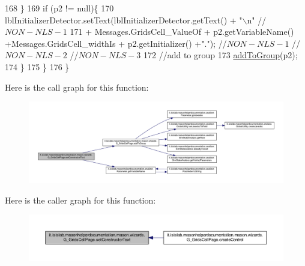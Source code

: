 \begin{DoxyCode}
168             \}
169             \textcolor{keywordflow}{if} (p2 != null)\{    
170                 lblInitializerDetector.setText(lblInitializerDetector.getText() + \textcolor{stringliteral}{"\(\backslash\)n"} \textcolor{comment}{//$NON-NLS-1$}
171                     +  Messages.GridsCell\_ValueOf + p2.getVariableName() +Messages.GridsCell\_widthIs + 
      p2.getInitializer() +\textcolor{stringliteral}{"."}); \textcolor{comment}{//$NON-NLS-1$ //$NON-NLS-2$ //$NON-NLS-3$}
172                 \textcolor{comment}{//add to group}
173                 \hyperlink{classit_1_1isislab_1_1masonhelperdocumentation_1_1mason_1_1wizards_1_1_g___grids_cell_page_a43c0ab8367d25f1cfd0cdc9e29f46e5c}{addToGroup}(p2);
174             \}           
175         \}
176     \}
\end{DoxyCode}


Here is the call graph for this function\-:
\nopagebreak
\begin{figure}[H]
\begin{center}
\leavevmode
\includegraphics[width=350pt]{classit_1_1isislab_1_1masonhelperdocumentation_1_1mason_1_1wizards_1_1_g___grids_cell_page_a10e043dce0e8661cadbb7a6ea569cb0e_cgraph}
\end{center}
\end{figure}




Here is the caller graph for this function\-:
\nopagebreak
\begin{figure}[H]
\begin{center}
\leavevmode
\includegraphics[width=350pt]{classit_1_1isislab_1_1masonhelperdocumentation_1_1mason_1_1wizards_1_1_g___grids_cell_page_a10e043dce0e8661cadbb7a6ea569cb0e_icgraph}
\end{center}
\end{figure}




